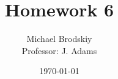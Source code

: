 


\title{Homework 6}
\date{\today}
\author{Michael Brodskiy\\ \small Professor: J. Adams}



\maketitle

